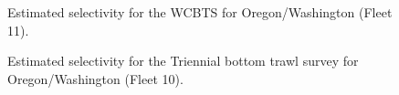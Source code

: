 \documentclass[
]{scrartcl}
\begin{document}
\begin{figure}


\caption{\label{fig-sel11}Estimated selectivity for the WCBTS for
Oregon/Washington (Fleet 11).}

\end{figure}%

\begin{figure}


\caption{\label{fig-sel10}Estimated selectivity for the Triennial bottom
trawl survey for Oregon/Washington (Fleet 10).}

\end{figure}%

\clearpage
\end{document}
